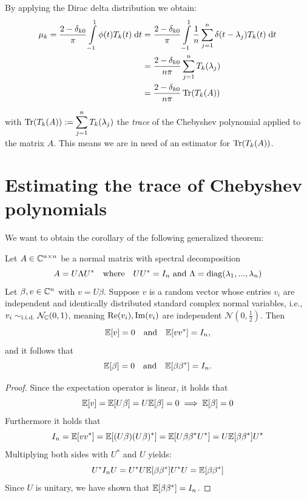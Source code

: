 By applying the Dirac delta distribution we obtain:
\begin{align*}
    \mu_k = \frac{2 - \delta_{k0}}{\pi} \int\limits_{-1}^1 \phi(t) T_k(t) \;\mathrm{d}t &= \frac{2 - \delta_{k0}}{\pi} \int\limits_{-1}^1 \frac{1}{n} \sum_{j = 1}^n \delta(t - \lambda_j) T_k(t) \;\mathrm{d}t \\
    &= \frac{2 - \delta_{k0}}{n \pi} \sum_{j = 1}^n T_k(\lambda_j)\\
    &= \frac{2 - \delta_{k0}}{n \pi} \operatorname{Tr}(T_k(A))
\end{align*}

with $\operatorname{Tr}(T_k(A)) := \displaystyle \sum_{j = 1}^n T_k(\lambda_j)$ the \emph{trace} of the Chebyshev polynomial applied to the matrix $A$. This means we are in need of an estimator for $\operatorname{Tr}(T_k(A))$.

\section{Estimating the trace of Chebyshev polynomials}

We want to obtain the corollary of the following generalized theorem:

\begin{theorem}
    Let $A \in \mathbb{C}^{n \times n}$ be a normal matrix with spectral decomposition
    \[
    A = U \Lambda U^* \quad \text{where} \quad UU^* = I_n \text{ and } \Lambda = \operatorname{diag}(\lambda_1, ..., \lambda_n)
    \]
    Let $\beta, v \in \mathbb{C}^n$ with $v = U\beta$.
    Suppose $v$ is a random vector whose entries $v_i$ are independent and identically distributed standard complex normal variables,
    i.e., $v_i \sim_\text{i.i.d.} \mathcal{N}_{\mathbb{C}}(0, 1)$, meaning $\operatorname{Re}(v_i), \operatorname{Im}(v_i)$ are independent $\mathcal{N}(0, \frac{1}{2})$.
    Then
    \begin{equation} \label{eq:complex_normal_vector}
        \mathbb{E}[v] = 0 \quad \text{and} \quad \mathbb{E}[v v^*] = I_n,
    \end{equation}
    and it follows that
    \[
    \mathbb{E}[\beta] = 0 \quad \text{and} \quad \mathbb{E}[\beta \beta^*] = I_n.
    \]
\end{theorem}


\begin{proof}[Proof]
    Since the expectation operator is linear, it holds that
    \[
    \mathbb{E}[v] = \mathbb{E}[U\beta] = U\mathbb{E}[\beta] = 0 \implies \mathbb{E}[\beta] = 0
    \]
    Furthermore it holds that
    \[
    I_n = \mathbb{E}[vv^*] = \mathbb{E}[(U\beta)(U\beta)^*] = \mathbb{E}[U\beta \beta^*U^*] = U \mathbb{E}[\beta \beta^*]U^*
    \]
    Multiplying both sides with $U^*$ and $U$ yields:
    \[
    U^* I_n U = U^* U \mathbb{E}[\beta \beta^*]U^* U = \mathbb{E}[\beta \beta^*]
    \]
    Since $U$ is unitary, we have shown that $\mathbb{E}[\beta \beta^*] = I_n$.
\end{proof}

